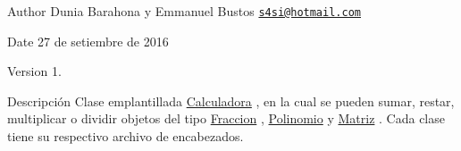 \begin{DoxyAuthor}{Author}
Dunia Barahona y Emmanuel Bustos \href{mailto:s4si@hotmail.com}{\tt s4si@hotmail.\+com} 
\end{DoxyAuthor}
\begin{DoxyDate}{Date}
27 de setiembre de 2016 
\end{DoxyDate}
\begin{DoxyVersion}{Version}
1. 
\end{DoxyVersion}
\begin{DoxyParagraph}{Descripción}
Clase emplantillada \hyperlink{class_calculadora}{Calculadora} , en la cual se pueden sumar, restar, multiplicar o dividir objetos del tipo \hyperlink{class_fraccion}{Fraccion} , \hyperlink{class_polinomio}{Polinomio} y \hyperlink{class_matriz}{Matriz} . Cada clase tiene su respectivo archivo de encabezados. 
\end{DoxyParagraph}
